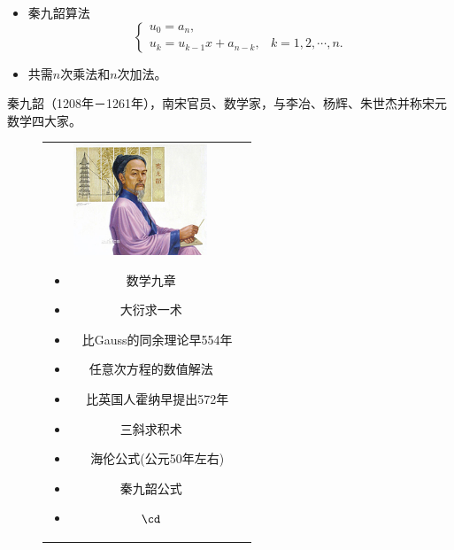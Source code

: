 \begin{frame}
\begin{itemize}
\item
\textcolor{acolor5}{秦九韶算法}
$$
\left\{
\begin{array}{ll}
u_0 = a_n, & \\[0.2cm]
u_k = u_{k-1} x + a_{n-k}, & k = 1, 2, \cdots, n.
\end{array}
\right.
$$
\item[]
共需$n$次乘法和$n$次加法。
\end{itemize}
\end{frame}
%
%
\begin{frame}
\textcolor{acolor5}{秦九韶}（1208年－1261年），南宋官员、数学家，与\textcolor{acolor5}{李冶、杨辉、朱世杰}并称宋元数学四大家。
\begin{figure}
\begin{tabular}{cc}   
\begin{minipage}{0.35\linewidth}
\centerline{\includegraphics[width=4.0cm]{Chapters/Ch01/figure/qinjiushao.jpg}}
\end{minipage}
\hfill
\begin{minipage}{.6\linewidth}
\begin{itemize}
\item {数学九章}
\item {大衍求一术}
\item[] ~~比Gauss的同余理论早554年
\item  {任意次方程的数值解法}
\item[] ~~比英国人霍纳早提出572年
\item  {三斜求积术}
\item[] ~~海伦公式(公元50年左右)
\item {秦九韶公式}
\item {$\cd$}
\end{itemize}
\end{minipage}
\end{tabular}
\end{figure}
\end{frame}

